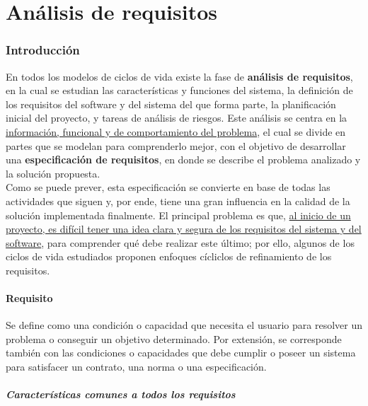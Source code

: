 \part{Análisis de requisitos}

\section{Introducción}

En todos los modelos de ciclos de vida existe la fase de \textbf{análisis de requisitos}, en la cual se estudian las características y funciones del sistema, la definición de los requisitos del software y del sistema del que forma parte, la planificación inicial del proyecto, y tareas de análisis de riesgos. Este análisis se centra en la \uline{información, funcional y de comportamiento del problema}, el cual se divide en partes que se modelan para comprenderlo mejor, con el objetivo de desarrollar una \textbf{especificación de requisitos}, en donde se describe el problema analizado y la solución propuesta.\\

Como se puede prever, esta especificación se convierte en base de todas las actividades que siguen y, por ende, tiene una gran influencia en la calidad de la solución implementada finalmente. El principal problema es que, \uline{al inicio de un proyecto, es difícil tener una idea clara y segura de los requisitos del sistema y del software}, para comprender qué debe realizar este último; por ello, algunos de los ciclos de vida estudiados proponen enfoques cícliclos de refinamiento de los requisitos.

\subsection{Requisito}

Se define como una condición o capacidad que necesita el usuario para resolver un problema o conseguir un objetivo determinado. Por extensión, se corresponde también con las condiciones o capacidades que debe cumplir o poseer un sistema para satisfacer un contrato, una norma o una especificación.

\subsubsection{Características comunes a todos los requisitos}

